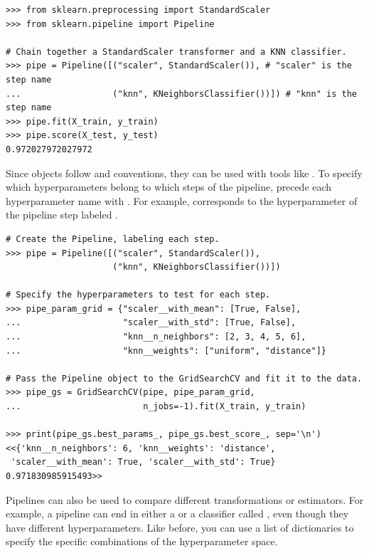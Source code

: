 \begin{lstlisting}
>>> from sklearn.preprocessing import StandardScaler
>>> from sklearn.pipeline import Pipeline

# Chain together a StandardScaler transformer and a KNN classifier.
>>> pipe = Pipeline([("scaler", StandardScaler()), # "scaler" is the step name
...                  ("knn", KNeighborsClassifier())]) # "knn" is the step name
>>> pipe.fit(X_train, y_train)
>>> pipe.score(X_test, y_test)
0.972027972027972
\end{lstlisting}

Since  objects follow  and  conventions, they can be used with tools like .
To specify which hyperparameters belong to which steps of the pipeline, precede each hyperparameter name with .
For example,  corresponds to the  hyperparameter of the pipeline step labeled .

\begin{lstlisting}
# Create the Pipeline, labeling each step.
>>> pipe = Pipeline([("scaler", StandardScaler()),
                     ("knn", KNeighborsClassifier())])

# Specify the hyperparameters to test for each step.
>>> pipe_param_grid = {"scaler__with_mean": [True, False],
...                    "scaler__with_std": [True, False],
...                    "knn__n_neighbors": [2, 3, 4, 5, 6],
...                    "knn__weights": ["uniform", "distance"]}

# Pass the Pipeline object to the GridSearchCV and fit it to the data.
>>> pipe_gs = GridSearchCV(pipe, pipe_param_grid,
...                        n_jobs=-1).fit(X_train, y_train)

>>> print(pipe_gs.best_params_, pipe_gs.best_score_, sep='\n')
<<{'knn__n_neighbors': 6, 'knn__weights': 'distance',
 'scaler__with_mean': True, 'scaler__with_std': True}
0.971830985915493>>
\end{lstlisting}

Pipelines can also be used to compare different transformations or estimators.
For example, a pipeline can end in either a  or a classifier called , even though they have different hyperparameters.
Like before, you can use a list of dictionaries to specify the specific combinations of the hyperparameter space.

